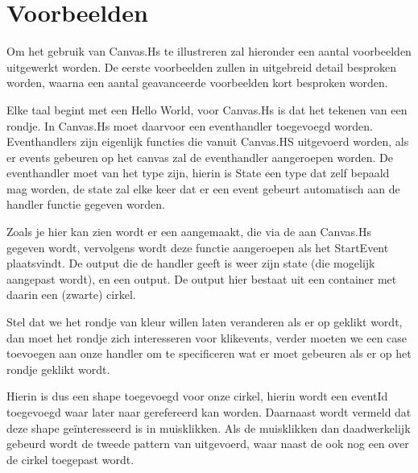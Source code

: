 \section{Voorbeelden}
Om het gebruik van Canvas.Hs te illustreren zal hieronder een aantal voorbeelden uitgewerkt worden. De eerste voorbeelden zullen in uitgebreid detail besproken worden, waarna een aantal geavanceerde voorbeelden kort besproken worden.

Elke taal begint met een Hello World, voor Canvas.Hs is dat het tekenen van een rondje. In Canvas.Hs moet daarvoor een eventhandler toegevoegd worden. Eventhandlers zijn eigenlijk functies die vanuit Canvas.HS uitgevoerd worden, als er events gebeuren op het canvas zal de eventhandler aangeroepen worden. De eventhandler moet van het type  zijn, hierin is State een type dat zelf bepaald mag worden, de state zal elke keer dat er een event gebeurt automatisch aan de handler functie gegeven worden.



Zoals je hier kan zien wordt er een  aangemaakt, die via de  aan Canvas.Hs gegeven wordt, vervolgens wordt deze functie aangeroepen als het StartEvent plaatsvindt. De output die de handler geeft is weer zijn state (die mogelijk aangepast wordt), en een output. De output hier bestaat uit een container met daarin een (zwarte) cirkel.

Stel dat we het rondje van kleur willen laten veranderen als er op geklikt wordt, dan moet het rondje zich interesseren voor klikevents, verder moeten we een case toevoegen aan onze handler om te specificeren wat er moet gebeuren als er op het rondje geklikt wordt.



Hierin is dus een  shape toegevoegd voor onze cirkel, hierin wordt een eventId toegevoegd waar later naar gerefereerd kan worden. Daarnaast wordt vermeld dat deze shape ge\"interesseerd is in muisklikken. Als de muisklikken dan daadwerkelijk gebeurd wordt de tweede pattern van  uitgevoerd, waar naast de  ook nog een  over de cirkel toegepast wordt.
